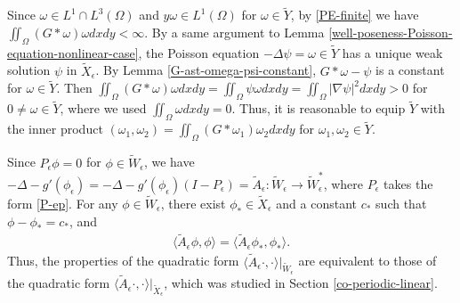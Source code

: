 \documentclass[1 [leqno, 11pt]{amsart}
\numberwithin{equation}{section}
\let\ep=\epsilon
\begin{document}
\begin{CJK*}{GBK}{song}
 Since $\omega\in L^1\cap L^3(\Omega)$ and $y\omega\in L^1(\Omega)$ for $\omega\in  \tilde Y$, by
\eqref{PE-finite} we have
$\iint_{\Omega}(G\ast\omega)\omega dxdy<\infty$. By a same argument to Lemma \ref{well-poseness-Poisson-equation-nonlinear-case},
 the Poisson equation
$-\Delta \psi = \omega\in \tilde Y$   has a  unique weak solution $\psi$ in $\tilde{X}_\ep$.
By Lemma \ref{G-ast-omega-psi-constant},
$G\ast\omega-\psi$ is a constant for $\omega\in \tilde Y$. Then $\iint_{\Omega}(G\ast\omega)\omega dxdy=\iint_{\Omega}\psi\omega dxdy=\iint_{\Omega}|\nabla\psi|^2 dxdy>0$ for $0\neq \omega\in\tilde Y$, where we used $\iint_{\Omega}\omega dxdy=0$. Thus, it is reasonable to equip
$\tilde Y$ with the inner product $(\omega_1, \omega_2) = \iint_{\Omega}(G\ast\omega_1)\omega_2 dxdy$ for $\omega_1, \omega_2 \in \tilde Y$.

Since $P_\ep\phi=0$ for $\phi\in \tilde W_\ep$, we have $-\Delta-g'(\phi_{\ep})=-\Delta-g'(\phi_{\ep})(I-P_\ep)=\tilde A_\ep: \tilde W_{\ep}\to\tilde W_{\ep}^*$, where $P_\ep$ takes the form  \eqref{P-ep}.
For any $\phi\in \tilde W_\ep$, there exist $\phi_*\in \tilde X_\ep$ and a constant $c_*$ such that $\phi-\phi_*=c_*$, and
\begin{align}\label{n-tilde A-w-x}
\langle\tilde A_\ep\phi,\phi\rangle=\langle\tilde A_\ep\phi_*,\phi_*\rangle.
\end{align}
Thus, the properties of the quadratic form $\langle\tilde A_\ep\cdot,\cdot\rangle|_{\tilde W_\ep}$ are equivalent to those of the quadratic form $\langle\tilde A_\ep\cdot,\cdot\rangle|_{\tilde X_\ep}$, which was studied in  Section \ref{co-periodic-linear}.


\end{CJK*}
\end{document}
